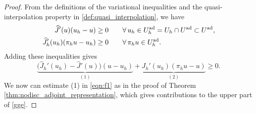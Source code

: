 \documentclass[a4paper,10pt]{article}
\newcommand{\Uad}{{U^{\textup{ad}}}}
\newcommand{\Uadh}{{U^{\textup{ad}}_h}}
\newcommand{\bq}{{\mathbf{q}}}
\newcommand{\bp}{{\mathbf{p}}}
\numberwithin{theorem}{section}
\begin{document}
\begin{proof}
From the definitions of the variational inequalities and the quasi-interpolation property in \eqref{def:quasi_interpolation}, we have 
\begin{align*}
 \widehat J'(u)(u_h - u) &\ge 0 \qquad \forall\, u_h \in \Uadh = U_h \cap \Uad \subset \Uad, \\
 \widehat J_h'(u_h)(\pi_h u - u_h) &\ge 0 \qquad \forall\, \pi_h u \in \Uadh.
\end{align*}
Adding these inequalities gives
\begin{equation}\label{eqn:f1}
   \underbrace{\big(\widehat J_h'(u_h) - \widehat J'(u)\big)(u - u_h)}_{(1)} + \underbrace{\widehat J_h'(u_h)(\pi_h u - u)}_{(2)} \ge 0.
\end{equation}
We now can estimate (1) in \eqref{eqn:f1} as in the proof of Theorem \ref{thm:nodisc_adjoint_representation}, which gives contributions to the upper part of \eqref{gge}. %

\end{proof}
\end{document}
